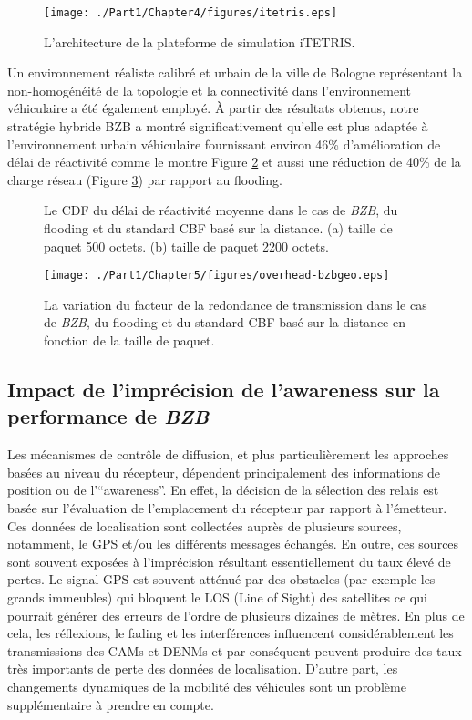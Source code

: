  \begin{figure}[!t]
 \centering
 \texttt{[image: ./Part1/Chapter4/figures/itetris.eps]}
 \caption{L'architecture de la plateforme de simulation iTETRIS.}
 \label{itetris}
 \end{figure}

Un environnement réaliste calibré et urbain de la ville de Bologne représentant la non-homogénéité de la topologie et la connectivité dans l'environnement véhiculaire a été également employé. À partir des résultats obtenus, notre stratégie hybride BZB a montré significativement qu'elle est plus adaptée à l'environnement urbain véhiculaire fournissant environ 46\% d'amélioration de délai de réactivité comme le montre Figure \ref{BZB-eval2} et aussi une réduction de 40\% de la charge réseau (Figure \ref{BZB-eval1}) par rapport au flooding.

\begin{figure}[!h]
\centering
{}
\caption{Le CDF du délai de réactivité moyenne dans le cas de \textit{BZB}, du flooding et du standard CBF basé sur la distance. (a) taille de paquet 500 octets. (b) taille de paquet 2200 octets.}
\label{BZB-eval2}
\end{figure}

\begin{figure}[!h]
\centering
\texttt{[image: ./Part1/Chapter5/figures/overhead-bzbgeo.eps]}
\caption{La variation du facteur de la redondance de transmission dans le cas de \textit{BZB}, du flooding et du standard CBF basé sur la distance en fonction de la taille de paquet.}
\label{BZB-eval1}
\end{figure}

\subsection{Impact de l'imprécision de l'awareness sur la performance de \textit{BZB}}

Les mécanismes de contrôle de diffusion, et plus particulièrement les approches basées au niveau du récepteur, dépendent principalement des informations de position ou de l'``awareness''. En effet, la décision de la sélection des relais est basée sur l'évaluation de l'emplacement du récepteur par rapport à l'émetteur.
Ces données de localisation sont collectées auprès de plusieurs sources, notamment, le GPS et/ou les différents messages échangés. En outre, ces sources sont souvent exposées à l'imprécision résultant essentiellement du taux élevé de pertes. Le signal GPS est souvent atténué par des obstacles (par exemple les grands immeubles) qui bloquent le LOS (Line of Sight) des satellites ce qui pourrait générer des erreurs de l'ordre de plusieurs dizaines de mètres. En plus de cela, les réflexions, le fading et les interférences influencent considérablement les transmissions des CAMs et DENMs et par conséquent peuvent produire des taux très importants de perte des données de localisation. D'autre part, les changements dynamiques de la mobilité des véhicules sont un problème supplémentaire à prendre en compte.

